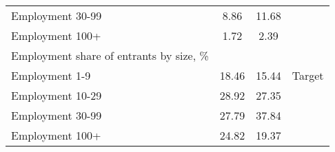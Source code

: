 \begin{tabular}{lccc}
\hspace{10mm}Employment 30-99 & 8.86 & 11.68 &  \\
\hspace{10mm}Employment 100+ & 1.72 & 2.39 &  \\
Employment share of entrants by size, \% &   &   &  \\
\hspace{10mm}Employment 1-9 & 18.46 & 15.44 & Target \\
\hspace{10mm}Employment 10-29 & 28.92 & 27.35 &  \\
\hspace{10mm}Employment 30-99 & 27.79 & 37.84 &  \\
\hspace{10mm}Employment 100+ & 24.82 & 19.37 &  \\
\bottomrule
\end{tabular}
